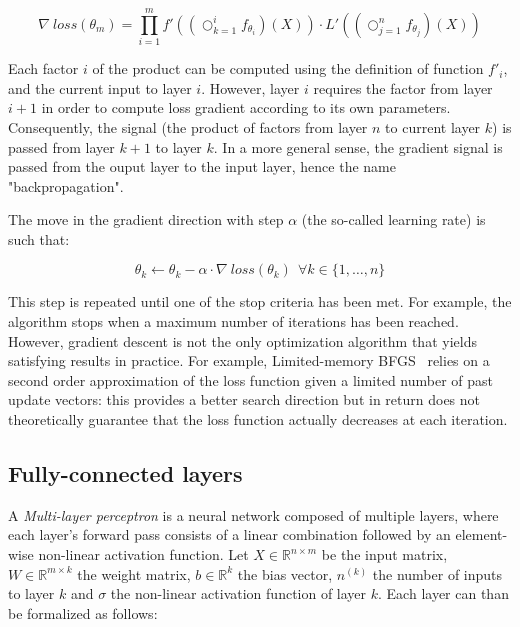         \begin{equation} \label{eq:loss}
            \nabla \ loss(\theta_m) = \prod_{i=1}^m f'((\bigcirc_{k=1}^{i} f_{\theta_i})(X)) \cdot L'((\bigcirc_{j=1}^{n} f_{\theta_j})(X))
        \end{equation}

        Each factor $i$ of the product can be computed using the definition of function $f'_i$, and the current input to layer $i$.
        However, layer $i$ requires the factor from layer $i+1$ in order to compute loss gradient according to its own parameters.
        Consequently, the signal (the product of factors from layer $n$ to current layer $k$) is passed from layer $k+1$ to layer $k$.
        In a more general sense, the gradient signal is passed from the ouput layer to the input layer, hence the name "backpropagation".

        The move in the gradient direction with step $\alpha$ (the so-called learning rate) is such that:

        \begin{equation}
            \theta_k \leftarrow \theta_k - \alpha \cdot \nabla \ loss(\theta_k) \  \ \forall k \in \{1, \ldots, n\}
        \end{equation}

        This step is repeated until one of the stop criteria has been met. For example, the algorithm stops when a maximum number of iterations has been
        reached. However, gradient descent is not the only optimization algorithm that yields satisfying results in practice.
        For example, Limited-memory BFGS~\cite{LBFGS} relies on a second order approximation of the loss function given a limited number of past
        update vectors: this provides a better search direction but in return does not theoretically guarantee that the loss function actually decreases at each
        iteration.

    \subsection{Fully-connected layers}

        A \textit{Multi-layer perceptron} is a neural network composed of multiple layers,
        where each layer's forward pass consists of a linear combination
        followed by an element-wise non-linear activation function.
        Let $X \in \mathbb{R}^{n \times m}$ be the input matrix,
        $W \in \mathbb{R}^{m \times k}$ the weight matrix,
        $b \in \mathbb{R}^{k}$ the bias vector, $n^{(k)}$ the number of inputs to layer $k$
        and $\sigma$ the non-linear activation function of layer $k$.
        Each layer can than be formalized as follows:

